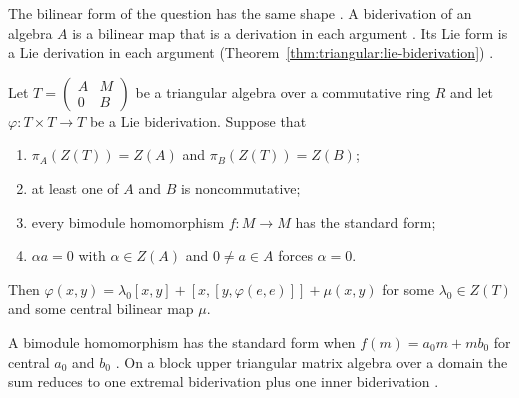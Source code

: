 The bilinear form of the question has the same shape
\cite[p.~2]{LiangRenWei2020}. A biderivation of an algebra $A$ is a bilinear
map that is a derivation in each argument \cite[p.~2]{LiangRenWei2020}. Its
Lie form is a Lie derivation in each argument
(Theorem~\ref{thm:triangular:lie-biderivation})
\cite[p.~2]{LiangRenWei2020}.\begin{theorem}\label{thm:triangular:lie-biderivation} Let
$T=\begin{pmatrix}A&M\\0&B\end{pmatrix}$ be a triangular algebra over a
commutative ring $R$ and let $\varphi\colon T\times T\to T$ be a Lie
biderivation. Suppose that \begin{enumerate} \item $\pi_A(Z(T))=Z(A)$ and
$\pi_B(Z(T))=Z(B)$; \item at least one of $A$ and $B$ is noncommutative; \item
every bimodule homomorphism $f\colon M\to M$ has the standard form; \item
$\alpha a=0$ with $\alpha\in Z(A)$ and $0\neq a\in A$ forces $\alpha=0$.
\end{enumerate} Then
$\varphi(x,y)=\lambda_0[x,y]+[x,[y,\varphi(e,e)]]+\mu(x,y)$ for some
$\lambda_0\in Z(T)$ and some central bilinear map $\mu$. \end{theorem}

A bimodule homomorphism has the standard form when $f(m)=a_0m+mb_0$ for
central $a_0$ and $b_0$ \cite[equation~(3.3), p.~7]{LiangRenWei2020}. On a
block upper triangular matrix algebra over a domain the sum reduces to one
extremal biderivation plus one inner biderivation \cite[Corollary~3.8,
p.~14]{LiangRenWei2020}.

